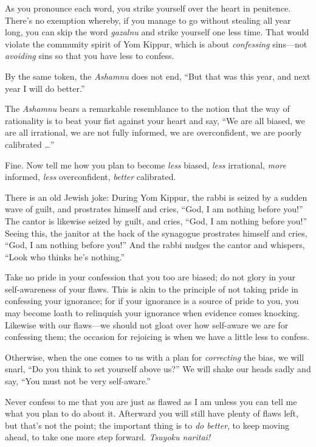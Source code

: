 {
 As you pronounce each word, you strike yourself over the heart in
penitence. There's no exemption whereby, if you manage
to go without stealing all year long, you can skip the word
\textit{gazalnu} and strike yourself one less time. That would violate
the community spirit of Yom Kippur, which is about \textit{confessing}
sins---not \textit{avoiding} sins so that you have less to confess.}

{
 By the same token, the \textit{Ashamnu} does not end,
``But that was this year, and next year I will do
better.''}

{
 The \textit{Ashamnu} bears a remarkable resemblance to the notion
that the way of rationality is to beat your fist against your heart and
say, ``We are all biased, we are all irrational, we
are not fully informed, we are overconfident, we are poorly calibrated
\ldots''}

{
 Fine. Now tell me how you plan to become \textit{less} biased,
\textit{less} irrational, \textit{more} informed, \textit{less}
overconfident, \textit{better} calibrated.}

{
 There is an old Jewish joke: During Yom Kippur, the rabbi is
seized by a sudden wave of guilt, and prostrates himself and cries,
``God, I am nothing before you!''
The cantor is likewise seized by guilt, and cries,
``God, I am nothing before you!''
Seeing this, the janitor at the back of the synagogue prostrates
himself and cries, ``God, I am nothing before
you!'' And the rabbi nudges the cantor and whispers,
``Look who thinks he's
nothing.''}

{
 Take no pride in your confession that you too are biased; do not
glory in your self-awareness of your flaws. This is akin to the
principle of not taking pride in confessing your ignorance; for if your
ignorance is a source of pride to you, you may become loath to
relinquish your ignorance when evidence comes knocking. Likewise with
our flaws---we should not gloat over how self-aware we are for
confessing them; the occasion for rejoicing is when we have a little
less to confess.}

{
 Otherwise, when the one comes to us with a plan for
\textit{correcting} the bias, we will snarl, ``Do you
think to set yourself above us?'' We will shake our
heads sadly and say, ``You must not be very
self-aware.''}

{
 Never confess to me that you are just as flawed as I am unless you
can tell me what you plan to do about it. Afterward you will still have
plenty of flaws left, but that's not the point; the
important thing is to \textit{do better}, to keep moving ahead, to take
one more step forward. \textit{Tsuyoku naritai!}}

